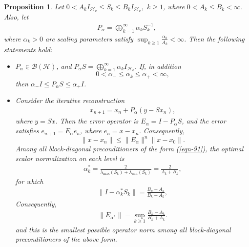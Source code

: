 \documentclass[12pt,titlepage]{amsart}
\newtheorem{prop}[thm]{Proposition}
\theoremstyle{definition}
\theoremstyle{remark}
\begin{document}
\begin{prop} \label{Prop.22}
Let $0<A_k I_{\mathcal H_k} \leq S_k \leq B_k I_{\mathcal H_k},
\,\ k\geq 1$, where $0<A_k\leq B_k<\infty $. Also, let
\begin{eqnarray} \label{eqn-91}
P_{\alpha} = \bigoplus_{k=1}^{\infty}\alpha_k S_k^{-1},
\end{eqnarray}
where $\alpha_k>0$ are scaling parameters satisfy
$\sup_{k\ge1}\frac{\alpha_k}{A_k}<\infty$. Then the following
statements hold:
\begin{itemize}
\item[(i)] $P_{\alpha}\in\mathcal B(\mathcal H)$, and $P_\alpha S
= \bigoplus_{k=1}^{\infty}\alpha_k I_{\mathcal H_k}$. If, in
addition $$0<\alpha_- \leq \alpha_k\leq \alpha_+<\infty ,$$ then
$\alpha_- I \leq P_\alpha S \leq \alpha_+ I$. \item[(ii)] Consider
the iterative reconstruction
\begin{eqnarray} \label{eqn-92}
x_{n+1} = x_n+ P_\alpha(y-Sx_n),
\end{eqnarray}
where $y=Sx$. Then the error operator is $E_\alpha = I-P_\alpha
S$, and the error satisfies $e_{n+1} = E_\alpha e_n$, where
$e_n=x-x_n$. Consequently,
$$\|x-x_n\| \leq \|E_\alpha\|^n\|x-x_0\|.$$
Among all block-diagonal preconditioners of the form
(\ref{eqn-91}), the optimal scalar normalization on each level is
\begin{eqnarray*}
\alpha_k^{*} = \frac{2} {\lambda_{\max}(S_k)+\lambda_{\min}(S_k)}=
\frac{2}{A_k+B_k},
\end{eqnarray*}
for which
\begin{eqnarray*}
\|I-\alpha_k^{*}S_k\| = \frac{B_k-A_k}{B_k+A_k},
\end{eqnarray*}
Consequently,
\begin{eqnarray*}
\|E_{\alpha^*}\| = \sup_{k\geq1} \frac{B_k-A_k}{B_k+A_k}.
\end{eqnarray*}
and this is the smallest possible operator norm among all
block-diagonal preconditioners of the above form.
\end{itemize}
\end{prop}
\end{document}
